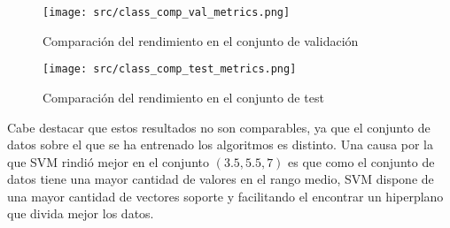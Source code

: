 \begin{figure}[H]
	\centering
	\texttt{[image: src/class\_comp\_val\_metrics.png]}
	\caption{Comparación del rendimiento en el conjunto de validación}
	\label{fig:class_cmp_val}
\end{figure}
\begin{figure}[H]
	\centering
	\texttt{[image: src/class\_comp\_test\_metrics.png]}
	\caption{Comparación del rendimiento en el conjunto de test}
	\label{fig:class_cmp_test}
\end{figure}
Cabe destacar que estos resultados no son comparables, ya que el conjunto de datos sobre el que se ha entrenado los algoritmos es distinto.
Una causa por la que  SVM rindió mejor en el conjunto $(3.5,5.5,7)$ es que como el conjunto de datos tiene una mayor cantidad de valores en el rango medio, SVM dispone de una mayor cantidad de vectores soporte y facilitando el encontrar un hiperplano que divida mejor los datos.
